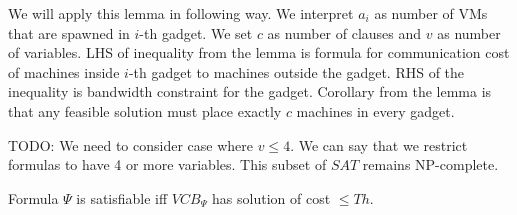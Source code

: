 We will apply this lemma in following way. We interpret $a_i$ as
number of VMs that are spawned in $i$-th gadget. We set $c$ as number
of clauses and $v$ as number of variables. LHS of inequality from the
lemma is formula for communication cost of machines inside $i$-th
gadget to machines outside the gadget. RHS of the inequality is
bandwidth constraint for the gadget. Corollary from the lemma is that
any feasible solution must place exactly $c$ machines in every gadget.

TODO: We need to consider case where $v \leq 4$. We can say that we
restrict formulas to have 4 or more variables. This subset of $SAT$ remains NP-complete.

\begin{theorem}Formula $\Psi$ is satisfiable iff $VCB_{\Psi}$ has
solution of cost $\leq Th$.
\end{theorem}

